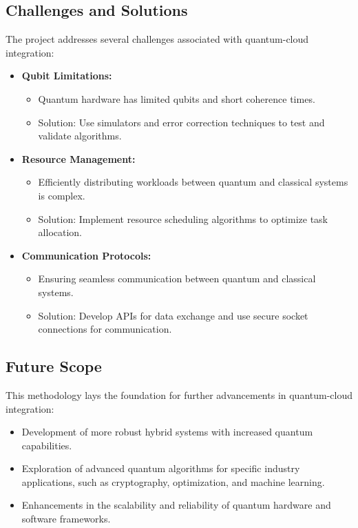\documentclass[12pt,a4paper]{article}
\begin{document}
\subsection{Challenges and Solutions}
The project addresses several challenges associated with quantum-cloud integration:
\begin{itemize}
    \item \textbf{Qubit Limitations:}
    \begin{itemize}
        \item Quantum hardware has limited qubits and short coherence times.
        \item Solution: Use simulators and error correction techniques to test and validate algorithms.
    \end{itemize}
    \item \textbf{Resource Management:}
    \begin{itemize}
        \item Efficiently distributing workloads between quantum and classical systems is complex.
        \item Solution: Implement resource scheduling algorithms to optimize task allocation.
    \end{itemize}
    \item \textbf{Communication Protocols:}
    \begin{itemize}
        \item Ensuring seamless communication between quantum and classical systems.
        \item Solution: Develop APIs for data exchange and use secure socket connections for communication.
    \end{itemize}
\end{itemize}

\subsection{Future Scope}
This methodology lays the foundation for further advancements in quantum-cloud integration:
\begin{itemize}
    \item Development of more robust hybrid systems with increased quantum capabilities.
    \item Exploration of advanced quantum algorithms for specific industry applications, such as cryptography, optimization, and machine learning.
    \item Enhancements in the scalability and reliability of quantum hardware and software frameworks.
\end{itemize}
\end{document}
